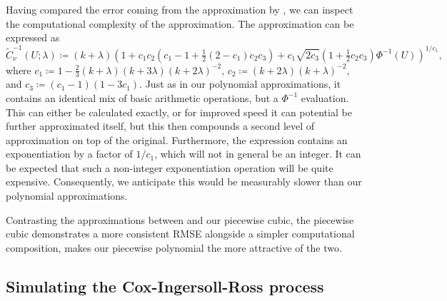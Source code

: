\documentclass[manuscript,review]{acmart}
\begin{document}
Having compared the error coming from the approximation by \citet{sankaran1959non}, we can inspect the computational complexity of the approximation. The approximation can be expressed as
\begin{equation*}
\label{eqt:sankaran_approx}
\widetilde{C}^{-1}_{\nu}(U; \lambda) \coloneqq 
(k + \lambda) \left(1 + c_1 c_2\left(c_1 - 1 + \tfrac{1}{2}(2 - c_1) c_2 c_3\right) + c_1 \sqrt{2 c_3}\left(1 + \tfrac{1}{2}c_2 c_3\right) \Phi^{-1}(U) \right)^{{1}/{c_1}},
\end{equation*}
where $ c_1 \coloneqq 1 - \tfrac{2}{3}(k + \lambda)(k+3\lambda)(k + 2\lambda)^{-2} $, 
$ c_2 \coloneqq (k+2\lambda)(k + \lambda)^{-2} $, 
and $ c_3 \coloneqq (c_1 - 1)(1 - 3c_1) $. Just as in our polynomial approximations, it contains an identical mix of basic arithmetic operations, but a $ \Phi^{-1} $ evaluation. This can either be calculated exactly, or for improved speed it can potential be further approximated itself, but this then compounds a second level of approximation on top of the original. Furthermore, the expression contains an exponentiation by a factor of $ 1/c_1 $, which will not in general be an integer. It can be expected that such a non-integer exponentiation operation will be quite expensive. Consequently, we anticipate this would be measurably slower than our polynomial approximations. 

Contrasting the approximations between \citet{sankaran1959non} and our piecewise cubic, the piecewise cubic demonstrates a more consistent RMSE alongside a simpler computational composition, makes our piecewise polynomial the more attractive of the two. 

\subsection{Simulating the Cox-Ingersoll-Ross process}
\end{document}
